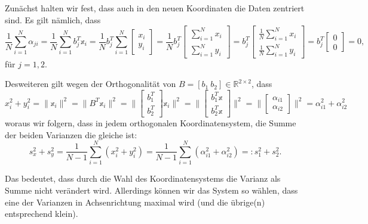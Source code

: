 \documentclass[]{book}
\theoremstyle{definition}
\theoremstyle{definition}
\theoremstyle{definition}
\theoremstyle{definition}
\theoremstyle{remark}
\begin{document}
Zunächst halten wir fest, dass auch in den neuen Koordinaten die Daten zentriert sind. Es gilt nämlich, dass
\begin{equation*}
\frac 1N \sum_{i=1}^N \alpha_{ji}=\frac 1N \sum_{i=1}^N b_j^T\mathbb x_i 
=\frac 1N b_j^T \sum_{i=1}^N \begin{bmatrix} x_i \\ y_i \end{bmatrix}
=\frac 1N b_j^T \begin{bmatrix} \sum_{i=1}^N x_i \\ \sum_{i=1}^N y_i \end{bmatrix}
=b_j^T \begin{bmatrix} \frac 1N \sum_{i=1}^N x_i \\ \frac 1N \sum_{i=1}^N y_i \end{bmatrix}
=b_j^T \begin{bmatrix} 0 \\ 0 \end{bmatrix} = 0,
\end{equation*}
für \(j=1,2\).

Desweiteren gilt wegen der Orthogonalität von \(B=[b_1~b_2]\in \mathbb R^{2\times 2}\), dass
\begin{equation*}
x_{i}^2 + y_{i}^2 = \|\mathbb x_i\|^2 = \|B^T\mathbb x_i\|^2 
= \|\begin{bmatrix} b_1^T \\ b_2^T \end{bmatrix} \mathbb x_i\|^2
= \|\begin{bmatrix} b_1^T\mathbb x \\ b_2^T\mathbb x \end{bmatrix}\|^2
= \|\begin{bmatrix} \alpha_{i1} \\ \alpha_{i2} \end{bmatrix}\|^2
= \alpha_{i1}^2 + \alpha_{i2}^2
\end{equation*}
woraus wir folgern, dass in jedem orthogonalen Koordinatensystem, die Summe der beiden Varianzen die gleiche ist:
\begin{equation*}
s_x^2 + s_y^2 = \frac{1}{N-1}\sum_{i=1}^N(x_i^2 + y_i^2) = \frac{1}{N-1}\sum_{i=1}^N(\alpha_{i1}^2 + \alpha_{i2}^2) =: s_1^2 + s_2^2.
\end{equation*}

Das bedeutet, dass durch die Wahl des Koordinatensystems die Varianz als Summe nicht verändert wird. Allerdings können wir das System so wählen, dass eine der Varianzen in Achsenrichtung maximal wird (und die übrige(n) entsprechend klein).
\end{document}

